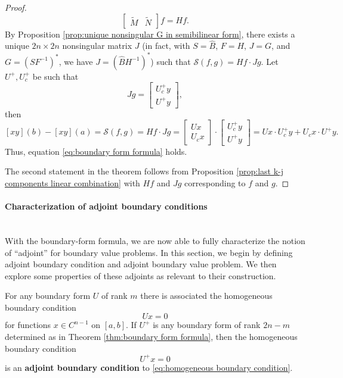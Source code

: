 \documentclass[12pt, oneside, a4paper]{article}
\begin{document}
\begin{proof}
\[\begin{bmatrix}
    \tilde{M} & \tilde{N}\end{bmatrix}f = Hf.\]
    By Proposition \ref{prop:unique nonsingular G in semibilinear form}, there exists a unique $2n\times 2n$ nonsingular matrix $J$ (in fact, with $S = \hat{B}$, $F=H$, $J=G$, and $G=(SF^{-1})^*$, we have $J=(\hat{B}H^{-1})^*$) such that $\mathcal{S}(f,g) = Hf\cdot Jg$. Let $U^+, U_c^+$ be such that
    \[Jg = \begin{bmatrix}U_c^+ y\\ U^+y\end{bmatrix},\]
    then 
    \[[xy](b)-[xy](a)=\mathcal{S}(f,g) = Hf\cdot Jg = \begin{bmatrix}Ux\\ U_cx\end{bmatrix}\cdot\begin{bmatrix}U_c^+ y \\ U^+y\end{bmatrix} = Ux\cdot U_c^+y + U_cx\cdot U^+y.\]
    Thus, equation \eqref{eq:boundary form formula} holds.

    The second statement in the theorem follows from Proposition \ref{prop:last k-j components linear combination} with $Hf$ and $Jg$ corresponding to $f$ and $g$.
\end{proof}

\paragraph{Characterization of adjoint boundary conditions}\mbox{}\\
With the boundary-form formula, we are now able to fully characterize the notion of ``adjoint'' for boundary value problems. In this section, we begin by defining adjoint boundary condition and adjoint boundary value problem. We then explore some properties of these adjoints as relevant to their construction.

\begin{defn}\cite[p.288-89]{CoddingtonLevinson}\label{defn:adjoint boundary condition}
    For any boundary form $U$ of rank $m$ there is associated the homogeneous boundary condition
    \begin{equation}\label{eq:homogeneous boundary condition}
        Ux=0
    \end{equation}
    for functions $x\in C^{n-1}$ on $[a,b]$. If $U^+$ is any boundary form of rank $2n-m$ determined as in Theorem \ref{thm:boundary form formula}, then the homogeneous boundary condition
    \begin{equation}\label{eq:adjoint boundary condition}
        U^+x=0
    \end{equation}
    is an \textbf{adjoint boundary condition} to \eqref{eq:homogeneous boundary condition}.
\end{defn}
\end{document}
